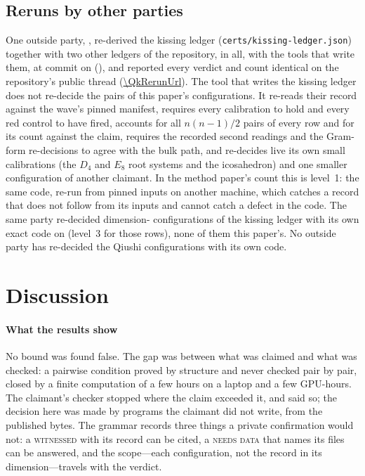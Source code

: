 \documentclass[preprint,11pt,authoryear,a4paper]{elsarticle}
\newcommand{\vword}[1]{{\normalfont\scshape #1}}
\newcommand{\vW}{\vword{witnessed}}
\newcommand{\vN}{\vword{needs data}}
\begin{document}
\subsection{Reruns by other parties}\label{sec:outside}
One outside party, \QkRerunWho, re-derived the kissing ledger (\texttt{certs/kissing-ledger.json}) together with two other ledgers of the repository, \QkRerunLedgers{} in all, with the tools that write them, at commit \texttt{\QkRerunCommit} on \QkRerunDate{} (\QkRerunEnv), and reported every verdict and count identical on the repository's public thread (\url{\QkRerunUrl}). The tool that writes the kissing ledger does not re-decide the pairs of this paper's configurations. It re-reads their record against the wave's pinned manifest, requires every calibration to hold and every red control to have fired, accounts for all $n(n-1)/2$ pairs of every row and for its count against the claim, requires the recorded second readings and the Gram-form re-decisions to agree with the bulk path, and re-decides live its own small calibrations (the $D_4$ and $E_8$ root systems and the icosahedron) and one smaller configuration of another claimant. In the method paper's count this is level~1: the same code, re-run from pinned inputs on another machine, which catches a record that does not follow from its inputs and cannot catch a defect in the code. The same party re-decided \QkRerunOwnRows{} dimension-\QkRerunOwnDim{} configurations of the kissing ledger with its own exact code on \QkRerunOwnDate{} (level~3 for those rows), none of them this paper's. No outside party has re-decided the Qiushi configurations with its own code.

\section{Discussion}\label{sec:discussion}

\paragraph{What the results show} No bound was found false. The gap was between what was claimed and what was checked: a pairwise condition proved by structure and never checked pair by pair, closed by a finite computation of a few hours on a laptop and a few GPU-hours. The claimant's checker stopped where the claim exceeded it, and said so; the decision here was made by programs the claimant did not write, from the published bytes. The grammar records three things a private confirmation would not: a \vW{} with its record can be cited, a \vN{} that names its files can be answered, and the scope---each configuration, not the record in its dimension---travels with the verdict.
\end{document}
